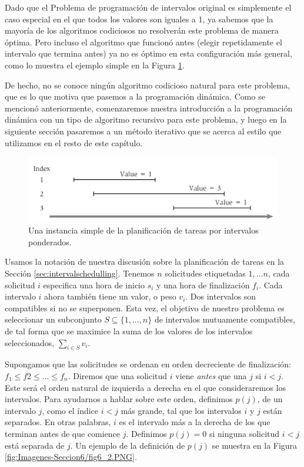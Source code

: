 \documentclass[a4paper, 12pt]{book}
\theoremstyle{dotless}
\begin{document}
Dado que el Problema de programación de intervalos original es simplemente el caso especial en el que todos los valores son iguales a 1, ya sabemos que la mayoría de los algoritmos codiciosos no resolverán este problema de manera óptima. Pero incluso el algoritmo que funcionó antes (elegir repetidamente el intervalo que termina antes) ya no es óptimo en esta configuración más general, como lo muestra el ejemplo simple en la Figura \ref{fig:Imagenes-Seccio6/fig6_1.PNG}.

De hecho, no se conoce ningún algoritmo codicioso natural para este problema, que es lo que motiva que pasemos a la programación dinámica. Como se mencionó anteriormente, comenzaremos nuestra introducción a la programación dinámica con un tipo de algoritmo recursivo para este problema, y luego en la siguiente sección pasaremos a un método iterativo que se acerca al estilo que utilizamos en el resto de este capítulo.

\begin{figure}[h]
\centering
\includegraphics[width=\textwidth]{Imagenes-Seccion6/fig6_1.PNG}
\caption{Una instancia simple de la planificación de tareas por intervalos ponderados.}
\label{fig:Imagenes-Seccio6/fig6_1.PNG}
\end{figure}

Usamos la notación de nuestra discusión sobre la planificación de tareas en la Sección \ref{sec:intervalschedulling}. Tenemos $n$ solicitudes etiquetadas $1,\dots n$, cada solicitud $i$ especifica una hora de inicio $s_i$ y una hora de finalización $f_i$. Cada intervalo $i$ ahora también tiene un valor, o peso $v_i$. Dos intervalos son compatibles si no se superponen. Esta vez, el objetivo de nuestro problema es seleccionar un subconjunto $S \subseteq \{1,. . . , n\}$ de intervalos mutuamente compatibles, de tal forma que se maximice la suma de los valores de los intervalos seleccionados, $\sum_{i \in S} v_i$.

Supongamos que las solicitudes se ordenan en orden decreciente de finalización: $f_1 \leq f2 \leq \dots \leq f_n$. Diremos que una solicitud $i$ viene \textit{antes} que una $j$ si $i<j$. Este será el orden natural de izquierda a derecha en el que consideraremos los intervalos. Para ayudarnos a hablar sobre este orden, definimos $p(j)$, de un intervalo $j$, como el índice $i<j$ más grande, tal que los intervalos $i$ y $j$ están separados. En otras palabras, $i$ es el intervalo más a la derecha de los que terminan antes de que comience $j$. Definimos $p(j) = 0$ si ninguna solicitud $i<j$ está separada de $j$. Un ejemplo de la definición de $p(j)$ se muestra en la Figura \ref{fig:Imagenes-Seccion6/fig6_2.PNG}.
\end{document}
